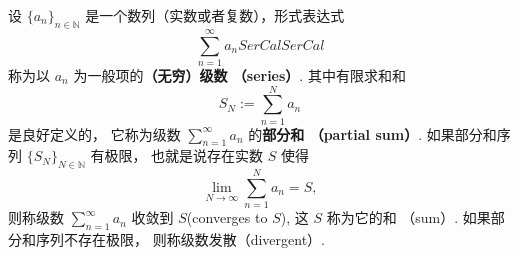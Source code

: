 


设 $\{a_n\}_{n\in\mathbb{N}}$ 是一个数列（实数或者复数），形式表达式
\[
\sum_{n=1}^\infty a_nSerCalSerCal
\]
称为以 $a_n$ 为一般项的\textbf{（无穷）级数 （series）}. 其中有限求和和
\[
S_N:=\sum_{n=1}^N a_n
\]
是良好定义的， 它称为级数 $\sum_{n=1}^\infty a_n$ 的\textbf{部分和 （partial sum）}. 如果部分和序列 $\{S_N\}_{N\in\mathbb{N}}$ 有极限， 也就是说存在实数 $S$ 使得
\[
\lim_{N\to\infty}\sum_{n=1}^N a_n=S,
\] 
则称级数 $\sum_{n=1}^\infty a_n$ 收敛到 $S$(converges to $S$), 这 $S$ 称为它的和 （sum）. 如果部分和序列不存在极限， 则称级数发散（divergent）. 

